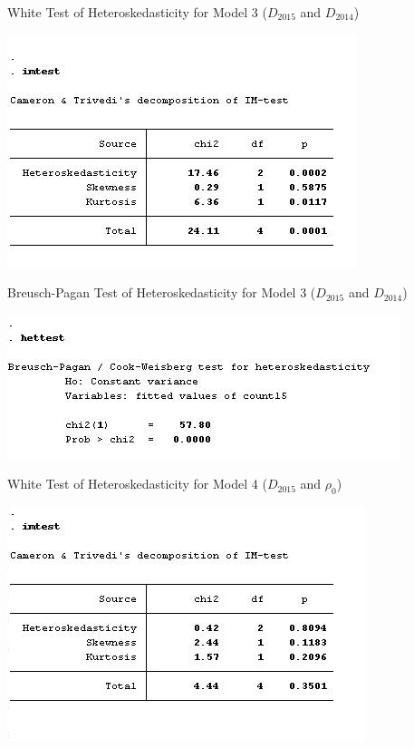 \documentclass[Journal,letterpaper, NoLineNumbers]{ascelike-new}
\begin{document}
\begin{table}
\centering
\caption{White Test of Heteroskedasticity for Model 3 ($D_{2015}$ and $D_{2014}$)}

\includegraphics[]{WhiteTestHabit.png}

\end{table}

\begin{table}
\centering
\caption{Breusch-Pagan Test of Heteroskedasticity for Model 3 ($D_{2015}$ and $D_{2014}$)}

\includegraphics[]{BPTestHabit.png}

\end{table}

\begin{table}
\centering
\caption{White Test of Heteroskedasticity for Model 4 ($D_{2015}$ and $\rho_0$)}

\includegraphics[]{WhiteTestLearning.png}

\end{table}
\end{document}
